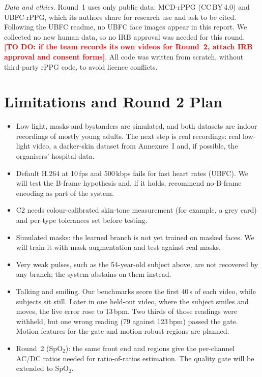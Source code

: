 \documentclass[conference]{IEEEtran}
\newcommand{\pending}[1]{\textcolor{red}{\textbf{[TO DO: #1]}}}
\newcommand{\bpm}{\,bpm}
\begin{document}
\textit{Data and ethics.} Round~1 uses only public data: MCD-rPPG (CC\,BY\,4.0) and UBFC-rPPG, which its
authors share for research use and ask to be cited. Following the UBFC readme, no UBFC face images
appear in this report. We collected no new human data, so no IRB approval was needed for this round. \pending{if the team
records its own videos for Round~2, attach IRB approval and consent forms}. All code was written from
scratch, without third-party rPPG code, to avoid licence conflicts.

\section{Limitations and Round 2 Plan}
\begin{itemize}
\item Low light, masks and bystanders are simulated, and both datasets are indoor recordings of mostly
young adults. The next step is real recordings: real low-light video, a darker-skin dataset from
Annexure~I and, if possible, the organisers' hospital data.
\item Default H.264 at 10\,fps and 500\,kbps fails for fast heart rates (UBFC). We will test the
B-frame hypothesis and, if it holds, recommend no-B-frame encoding as part of the system.
\item C2 needs colour-calibrated skin-tone measurement (for example, a grey card) and per-type tolerances
set before testing.
\item Simulated masks: the learned branch is not yet trained on masked faces. We will train it with mask
augmentation and test against real masks.
\item Very weak pulses, such as the 54-year-old subject above, are not recovered by any branch; the
system abstains on them instead.
\item Talking and smiling. Our benchmarks score the first 40\,s of each video, while subjects sit still.
Later in one held-out video, where the subject smiles and moves, the live error rose to 13\bpm. Two thirds
of those readings were withheld, but one wrong reading (79 against 123\bpm) passed the gate. Motion
features for the gate and motion-robust regions are planned.
\item Round~2 (SpO$_2$): the same front end and regions give the per-channel AC/DC ratios needed for
ratio-of-ratios estimation. The quality gate will be extended to SpO$_2$.
\end{itemize}
\end{document}
